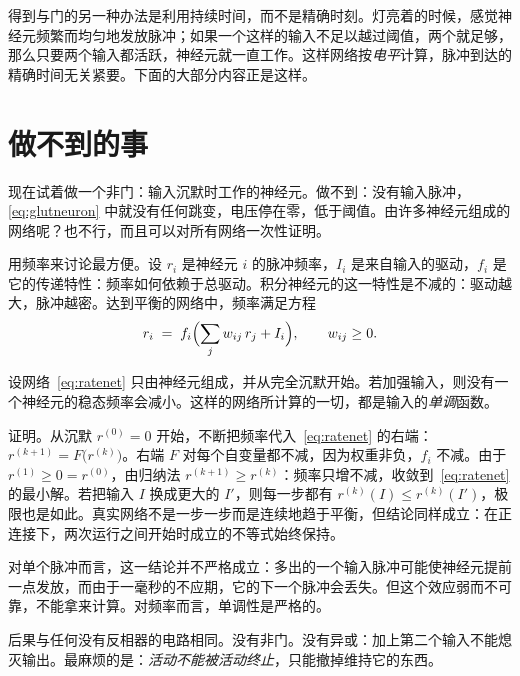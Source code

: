 得到与门的另一种办法是利用持续时间，而不是精确时刻。灯亮着的时候，感觉神经元频繁而均匀地发放脉冲；如果一个这样的输入不足以越过阈值，两个就足够，那么只要两个输入都活跃，神经元就一直工作。这样网络按\emph{电平}计算，脉冲到达的精确时间无关紧要。下面的大部分内容正是这样。

\section{做不到的事}

现在试着做一个非门：输入沉默时工作的神经元。做不到：没有输入脉冲，\eqref{eq:glutneuron} 中就没有任何跳变，电压停在零，低于阈值。由许多神经元组成的网络呢？也不行，而且可以对所有网络一次性证明。

用频率来讨论最方便。设 $r_i$ 是神经元 $i$ 的脉冲频率，$I_i$ 是来自输入的驱动，$f_i$ 是它的传递特性：频率如何依赖于总驱动。积分神经元的这一特性是不减的：驱动越大，脉冲越密。达到平衡的网络中，频率满足方程
\begin{equation}
r_i \;=\; f_i\Bigl(\sum_j w_{ij}\,r_j + I_i\Bigr), \qquad w_{ij}\ge 0 .
\label{eq:ratenet}
\end{equation}

\begin{keyblock}
\begin{proposition}[单调性]
\label{prop:monotone}
设网络~\eqref{eq:ratenet} 只由神经元组成，并从完全沉默开始。若加强输入，则没有一个神经元的稳态频率会减小。这样的网络所计算的一切，都是输入的\emph{单调}函数。
\end{proposition}
\end{keyblock}

证明。从沉默 $r^{(0)}=0$ 开始，不断把频率代入~\eqref{eq:ratenet} 的右端：$r^{(k+1)}=F\bigl(r^{(k)}\bigr)$。右端 $F$ 对每个自变量都不减，因为权重非负，$f_i$ 不减。由于 $r^{(1)}\ge0=r^{(0)}$，由归纳法 $r^{(k+1)}\ge r^{(k)}$：频率只增不减，收敛到~\eqref{eq:ratenet} 的最小解。若把输入 $I$ 换成更大的 $I'$，则每一步都有 $r^{(k)}(I)\le r^{(k)}(I')$，极限也是如此。真实网络不是一步一步而是连续地趋于平衡，但结论同样成立：在正连接下，两次运行之间开始时成立的不等式始终保持。

对单个脉冲而言，这一结论并不严格成立：多出的一个输入脉冲可能使神经元提前一点发放，而由于一毫秒的不应期，它的下一个脉冲会丢失。但这个效应弱而不可靠，不能拿来计算。对频率而言，单调性是严格的。

后果与任何没有反相器的电路相同。没有非门。没有异或：加上第二个输入不能熄灭输出。最麻烦的是：\emph{活动不能被活动终止}，只能撤掉维持它的东西。

